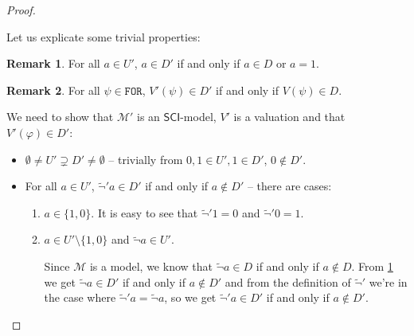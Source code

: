 \documentclass{article}
\theoremstyle{definition}
\theoremstyle{definition}
\theoremstyle{definition}
\newtheorem{remark}{Remark}[section]
\theoremstyle{definition}
\theoremstyle{definition}
\newcommand*{\FOR}{\texttt{FOR}}
\newcommand{\SCI}{$\mathsf{SCI}$\xspace}
\begin{document}
\begin{proof}
\begin{itemize}
    \end{itemize}
    Let us explicate some trivial properties:
    \begin{remark}
        \label{trivial_1}
        For all $a \in U'$, $a \in D'$ if and only if $a \in D$ or $a = 1$.
    \end{remark}
    \begin{remark}
        \label{trivial_2}
        For all $\psi \in \FOR$, $V'(\psi) \in D'$ if and only if $V(\psi) \in D$.
    \end{remark}
    We need to show that $\mathcal{M'}$ is an \SCI-model, $V'$ is a valuation and
    that $V'(\varphi) \in D'$:
    \begin{itemize}
        \item $\emptyset \not = U' \supsetneq D' \not = \emptyset$ -- trivially from $0, 1 \in U', 1 \in D'$, $0 \not \in D'$.
        \item For all $a \in U'$, $\tilde{\lnot}'a \in D'$ if and only if $a \not \in D'$ --
              there are cases:
              \begin{enumerate}
                  \item[1°] $a \in \{1, 0\}$. It is easy to see that $\tilde{\lnot}'1 = 0$ and $\tilde{\lnot}'0 = 1$.
                  \item[2°] $a \in U' \setminus \{1, 0\}$ and $\tilde{\lnot} a \in U'$.

                      Since $\mathcal{M}$ is a model, we know that $\tilde{\lnot}a \in D$ if and only
                      if $a \not \in D$. From \cref{trivial_1} we get $\tilde{\lnot}a \in D'$ if and
                      only if $a \not \in D'$ and from the definition of $\tilde{\lnot}'$ we're in
                      the case where $\tilde{\lnot}'a = \tilde{\lnot} a$, so we get $\tilde{\lnot}'a
                          \in D'$ if and only if $a \not \in D'$.


\end{enumerate}
\end{itemize}
\end{proof}
\end{document}

